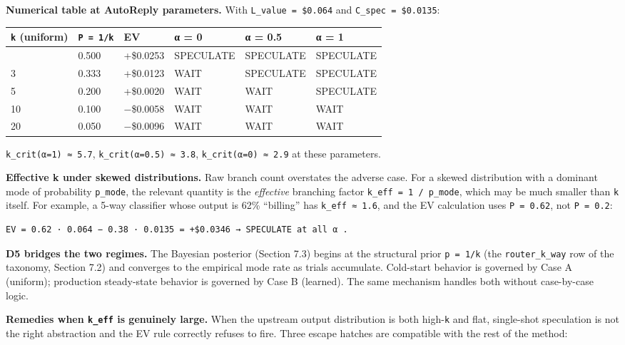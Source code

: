 \documentclass[
  11pt,
]{article}
\newcounter{none} %
\begin{document}
\textbf{Numerical table at AutoReply parameters.} With
\texttt{L\_value\ =\ \$0.064} and \texttt{C\_spec\ =\ \$0.0135}:

{\def\LTcaptype{none} %
\begin{longtable}[]{@{}llllll@{}}
\toprule\noalign{}
\texttt{k} (uniform) & \texttt{P\ =\ 1/k} & EV & α = 0 & α = 0.5 & α =
1 \\
\midrule\noalign{}
\endhead
\bottomrule\noalign{}
\endlastfoot
2 & 0.500 & +\$0.0253 & SPECULATE & SPECULATE & SPECULATE \\
3 & 0.333 & +\$0.0123 & WAIT & SPECULATE & SPECULATE \\
5 & 0.200 & +\$0.0020 & WAIT & WAIT & SPECULATE \\
10 & 0.100 & −\$0.0058 & WAIT & WAIT & WAIT \\
20 & 0.050 & −\$0.0096 & WAIT & WAIT & WAIT \\
\end{longtable}
}

\texttt{k\_crit(α=1)\ ≈\ 5.7}, \texttt{k\_crit(α=0.5)\ ≈\ 3.8},
\texttt{k\_crit(α=0)\ ≈\ 2.9} at these parameters.

\textbf{Effective k under skewed distributions.} Raw branch count
overstates the adverse case. For a skewed distribution with a dominant
mode of probability \texttt{p\_mode}, the relevant quantity is the
\emph{effective} branching factor \texttt{k\_eff\ =\ 1\ /\ p\_mode},
which may be much smaller than \texttt{k} itself. For example, a 5-way
classifier whose output is 62\% ``billing'' has \texttt{k\_eff\ ≈\ 1.6},
and the EV calculation uses \texttt{P\ =\ 0.62}, not \texttt{P\ =\ 0.2}:

\begin{verbatim}
EV = 0.62 · 0.064 − 0.38 · 0.0135 = +$0.0346 → SPECULATE at all α .
\end{verbatim}

\textbf{D5 bridges the two regimes.} The Bayesian posterior (Section
7.3) begins at the structural prior \texttt{p\ =\ 1/k} (the
\texttt{router\_k\_way} row of the taxonomy, Section 7.2) and converges
to the empirical mode rate as trials accumulate. Cold-start behavior is
governed by Case A (uniform); production steady-state behavior is
governed by Case B (learned). The same mechanism handles both without
case-by-case logic.

\textbf{Remedies when \texttt{k\_eff} is genuinely large.} When the
upstream output distribution is both high-\texttt{k} and flat,
single-shot speculation is not the right abstraction and the EV rule
correctly refuses to fire. Three escape hatches are compatible with the
rest of the method:
\end{document}
